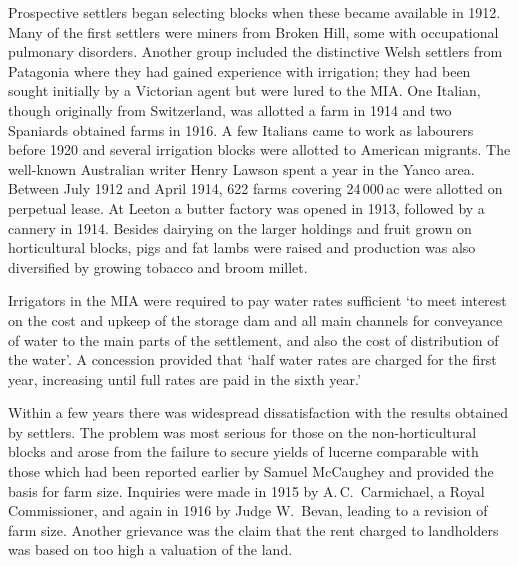 Prospective settlers began selecting blocks when these became
available in 1912.  Many of the first settlers were miners from Broken
Hill, some with occupational pulmonary disorders.  Another group
included the distinctive Welsh settlers from Patagonia where they had
gained experience with irrigation; they had been sought initially by a
Victorian agent but were lured to the MIA.  One Italian, though
originally from Switzerland, was allotted a farm in 1914 and two
Spaniards obtained farms in 1916.  A few Italians came to work as labourers
before 1920 and several irrigation blocks were allotted to American
migrants.  The well-known Australian writer Henry Lawson spent a year
in the Yanco area.  Between July 1912 and
April 1914, 622 farms covering 24\,000\,ac were allotted on perpetual
lease.  At Leeton a butter factory was opened in 1913, followed by a
cannery in 1914.  Besides dairying on the larger holdings and fruit
grown on horticultural blocks, pigs and fat lambs were raised and
production was also diversified by growing tobacco and broom
millet.

Irrigators in the MIA were required to pay water rates sufficient `to
meet interest on the cost and upkeep of the storage dam and all main
channels for conveyance of water to the main parts of the settlement,
and also the cost of distribution of the water'. A concession provided
that `half water rates are charged for the first year, increasing
until full rates are paid in the sixth year.'

Within a few years there was widespread dissatisfaction with the
results obtained by settlers.  The problem was most serious for those
on the non-horticultural blocks and arose from the failure to secure
yields of lucerne comparable with those which had been reported
earlier by Samuel McCaughey and provided the basis for farm size.
Inquiries were made in 1915 by A.\,C.~Carmichael, a Royal
Commissioner, and again in 1916 by Judge W.~Bevan, leading to a
revision of farm size.  Another
grievance was the claim that the rent charged to landholders was based
on too high a valuation of the land.

